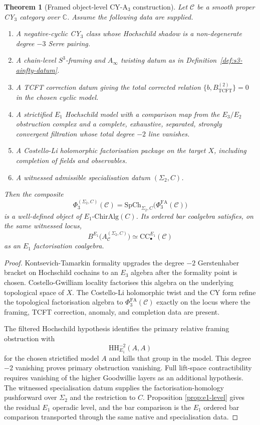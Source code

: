 \documentclass[11pt]{article}
\newtheorem{theorem}{Theorem}[section]
\begin{document}
\begin{theorem}[Framed object-level CY-A$_3$ construction]
\label{thm:framed-cya3}
Let $\mathcal C$ be a smooth proper CY$_3$ category over $\mathbb C$.
Assume the following data are supplied.
\begin{enumerate}[label=\textup{(H\arabic*)}]
\item A negative-cyclic CY$_3$ class whose Hochschild shadow is a
non-degenerate degree $-3$ Serre pairing.
\item A chain-level $S^3$-framing and $A_\infty$ twisting datum as in
Definition~\ref{def:s3-ainfty-datum}.
\item A TCFT correction datum giving the total corrected relation
$\{b,B^{(2)}_{\mathrm{TCFT}}\}=0$ in the chosen cyclic model.
\item A strictified $E_1$ Hochschild model with a comparison map from
the $E_3/E_2$ obstruction complex and a complete, exhaustive,
separated, strongly convergent filtration whose total degree $-2$ line
vanishes.
\item A Costello-Li holomorphic factorisation package on the target
$X$, including completion of fields and observables.
\item A witnessed admissible specialisation datum $(\Sigma_2,C)$.
\end{enumerate}
Then the composite
\[
  \Phi^{(\Sigma_2,C)}_3(\mathcal C)
  =
  \mathrm{SpCh}_{\Sigma_2,C}\bigl(\Phi^{\mathrm{FA}}_3(\mathcal C)\bigr)
\]
is a well-defined object of $E_1\text{-}\mathrm{ChirAlg}(C)$.  Its
ordered bar coalgebra satisfies, on the same witnessed locus,
\[
  B^{E_1}\bigl(A_{\mathcal C}^{(\Sigma_2,C)}\bigr)
  \simeq
  \mathrm{CC}^{E_1}_{\bullet}(\mathcal C)
\]
as an $E_1$ factorisation coalgebra.
\end{theorem}

\begin{proof}
Kontsevich-Tamarkin formality upgrades the degree $-2$ Gerstenhaber
bracket on Hochschild cochains to an $E_3$ algebra after the formality
point is chosen.  Costello-Gwilliam locality factorises this algebra on
the underlying topological space of $X$.  The Costello-Li holomorphic
twist and the CY form refine the topological factorisation algebra to
$\Phi^{\mathrm{FA}}_3(\mathcal C)$ exactly on the locus where the
framing, TCFT correction, anomaly, and completion data are present.

The filtered Hochschild hypothesis identifies the primary relative
framing obstruction with
\[
  \mathrm{HH}^{-2}_{E_1}(A,A)
\]
for the chosen strictified model $A$ and kills that group in the model.
This degree $-2$ vanishing proves primary obstruction vanishing.  Full
lift-space contractibility requires vanishing of the higher Goodwillie
layers as an additional hypothesis.
The witnessed specialisation datum supplies the factorisation-homology
pushforward over $\Sigma_2$ and the restriction to $C$.  Proposition
\ref{prop:e1-level} gives the residual $E_1$ operadic level, and the
bar comparison is the $E_1$ ordered bar comparison transported through
the same native and specialisation data.
\end{proof}
\end{document}
